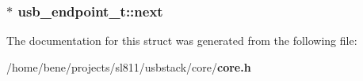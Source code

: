 \subsubsection{$\ast$ {\bf usb\_\-endpoint\_\-t::next}}\label{structusb__endpoint__t_e09789de6109fe4a50a055518e3c2081}




The documentation for this struct was generated from the following file:\begin{CompactItemize}
\item 
/home/bene/projects/sl811/usbstack/core/{\bf core.h}\end{CompactItemize}
